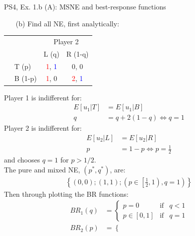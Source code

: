 \begin{frame}{PS4, Ex. 1.b (A): MSNE and best-response functions}
  \begin{multicols}{2}
    \begin{itemize}
      \item[(b)] Find all NE, first analytically:
    \end{itemize}
    \begin{table}
      \begin{tabular}{cl|c|c|}
        & \multicolumn{1}{c}{} & \multicolumn{2}{c}{\color{blue}Player 2}\\
        \parbox[t]{1mm}{}
        &  &  &  \\
        & T (p) & \textcolor{red}{1}, \textcolor{blue}{1} & 0, 0 \\
        & B (1-p) & \textcolor{red}{1}, 0 & \textcolor{red}{2}, \textcolor{blue}{1} \\
      \end{tabular}
    \end{table}
    Player 1 is indifferent for:
    \begin{align*}
      E[u_1|T]&=E[u_1|B]\\
      q &= q + 2(1-q) \Leftrightarrow q = 1
    \end{align*}
    Player 2 is indifferent for:
    \begin{align*}
      E[u_2|L]&=E[u_2|R]\\
      p &= 1-p \Leftrightarrow p = \frac{1}{2}
    \end{align*}
    and chooses $q=1$ for $p>1/2$.\\\medskip
    The pure and mixed NE, $(p^{*},q^{*})$, are:
    \begin{align*}
      \left\{(0,0);(1,1);\left(p\in\left[\frac{1}{2},1\right),q=1\right)\right\}
    \end{align*}
  \vfill\null \columnbreak
    Then through plotting the BR functions:
    \vspace{-8pt}
    \begin{align*}
      BR_1(q)&=\left\{ \begin{array}{lcl}
          p=0       & \text{if} & q<1 \\
          p\in[0,1] & \text{if} & q=1
      \end{array}\right. \\
      BR_2(p)&=\left\{ \begin{array}{lcl}

\end{array}
\end{align*}
\end{multicols}
\end{frame}
